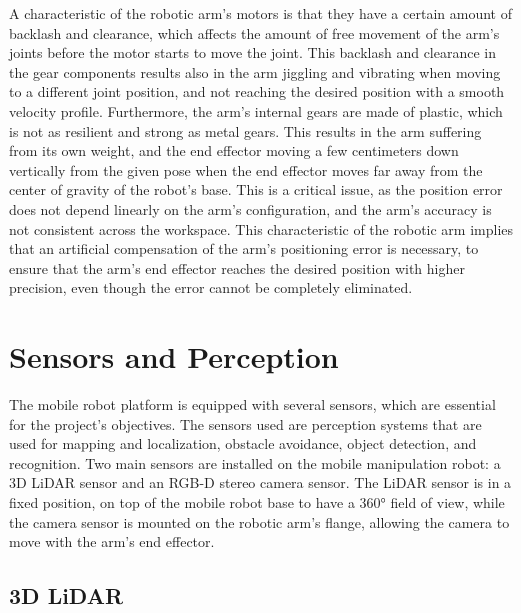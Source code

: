 A characteristic of the robotic arm's motors is that they have a certain amount of backlash and clearance,
which affects the amount of free movement of the arm's joints before the motor starts to move the joint.
This backlash and clearance in the gear components results also in the arm jiggling and vibrating when moving to a
different joint position, and not reaching the desired position with a smooth velocity profile.
Furthermore, the arm's internal gears are made of plastic, which is not as resilient and strong as metal gears.
This results in the arm suffering from its own weight, and the end effector moving a few centimeters down vertically from
the given pose when the end effector moves far away from the center of gravity of the robot's base. This is a critical
issue, as the position error does not depend linearly on the arm's configuration, and the arm's accuracy is not consistent
across the workspace. This characteristic of the robotic arm implies that an artificial compensation of the arm's
positioning error is necessary, to ensure that the arm's end effector reaches the desired position with higher precision,
even though the error cannot be completely eliminated.

\section{Sensors and Perception}

The mobile robot platform is equipped with several sensors, which are essential for the project's
objectives. The sensors used are perception systems that are used for mapping and localization, 
obstacle avoidance, object detection, and recognition.
Two main sensors are installed on the mobile manipulation robot: a 3D LiDAR sensor and an RGB-D stereo camera sensor.
The LiDAR sensor is in a fixed position, on top of the mobile robot base to have a 360° field of view, while the camera sensor
is mounted on the robotic arm's flange, allowing the camera to move with the arm's end effector.

\subsection{3D LiDAR}

